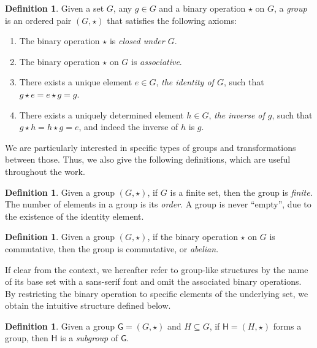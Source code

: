 \documentclass[english]{ufsc-thesis-rn46-2019/ufsc-thesis-rn46-2019}
\theoremstyle{definition}
\newtheorem{definition}[theorem]{Definition}
\begin{document}
\begin{definition}
  Given a set $G$, any $g \in G$ and a binary operation $\star$ on $G$, a
  \emph{group} is an ordered pair $(G, \star)$ that satisfies the following
  axioms:

  \begin{enumerate}
    \item The binary operation $\star$ is \emph{closed under $G$}.
    \item The binary operation $\star$ on $G$ is \emph{associative}.
    \item There exists a unique element $e \in G$, \emph{the identity of $G$},
      such that $g \star e = e \star g = g$.
    \item There exists a uniquely determined element $h \in G$, \emph{the
      inverse of $g$}, such that $g \star h = h \star g = e$, and indeed the
      inverse of $h$ is $g$.
  \end{enumerate}
\end{definition}

We are particularly interested in specific types of groups and transformations
between those. Thus, we also give the following definitions, which are useful
throughout the work.

\begin{definition}
  Given a group $(G, \star)$, if $G$ is a finite set, then the group is
  \emph{finite}. The number of elements in a group is its \emph{order}. A group
  is never ``empty'', due to the existence of the identity element.
\end{definition}

\begin{definition}
  Given a group $(G, \star)$, if the binary operation $\star$ on $G$ is
  commutative, then the group is commutative, or \emph{abelian}.
\end{definition}

If clear from the context, we hereafter refer to group-like structures by the
name of its base set with a sans-serif font and omit the associated binary
operations. By restricting the binary operation to specific elements of the
underlying set, we obtain the intuitive structure defined below.

\begin{definition}\label{def:subgroup}
  Given a group $\textsf{G} = (G, \star)$ and $H \subseteq G$, if
  $\mathsf{H} = (H, \star)$ forms a group, then $\mathsf{H}$ is a
  \emph{subgroup} of $\mathsf{G}$.
\end{definition}
\end{document}
